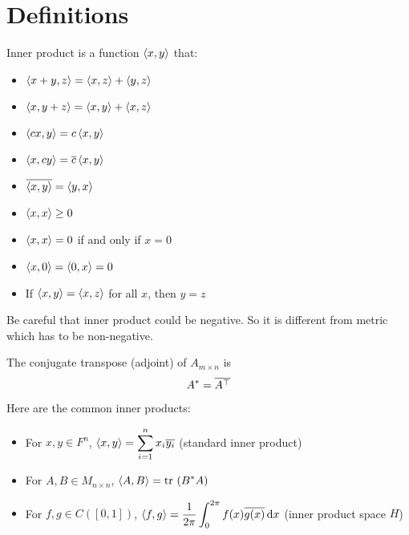 \section{Definitions}

Inner product is a function $\left\langle \displaystyle x, y \right\rangle$ that:
\begin{itemize}
    \item $\left\langle \displaystyle x + y, z \right\rangle = \left\langle \displaystyle x, z \right\rangle + \left\langle \displaystyle y, z \right\rangle$    
    \item $\left\langle \displaystyle x, y+z \right\rangle = \left\langle \displaystyle x, y \right\rangle + \left\langle \displaystyle x, z \right\rangle$
    \item $\left\langle \displaystyle cx, y \right\rangle = c \left\langle \displaystyle x, y \right\rangle$
    \item $\left\langle \displaystyle x, cy \right\rangle = \overline{c} \left\langle \displaystyle x, y \right\rangle$
    \item $\overline{\left\langle \displaystyle x, y \right\rangle} = \left\langle \displaystyle y, x \right\rangle$
    \item $\left\langle \displaystyle x, x \right\rangle \geq 0$
    \item $\left\langle \displaystyle x, x \right\rangle = 0$ if and only if $x = 0$
    \item $\left\langle \displaystyle x, 0 \right\rangle = \left\langle \displaystyle 0, x \right\rangle = 0$
    \item If $\left\langle \displaystyle x, y \right\rangle = \left\langle \displaystyle x, z \right\rangle$ for all $x$, then $y = z$
\end{itemize}

Be careful that inner product could be negative. So it is different from metric which has to be non-negative.

\begin{definition}
    The conjugate transpose (adjoint) of $A_{m \times n}$ is 
    \begin{equation}
        A^* = \overline{{A}^\top}
    \end{equation}
\end{definition}

\begin{example}
    Here are the common inner products:
\begin{itemize}
    \item For $x,y \in F^n$, $\displaystyle \left\langle \displaystyle x, y \right\rangle = \sum_{i=1}^n x_i \overline{y_i}$ (standard inner product)
    \item For $A,B \in M_{n \times n}$, $\left\langle \displaystyle A, B \right\rangle = \displaystyle \mathrm{tr}~( B^* A )$
    \item For $f,g \in C([0,1])$, $\displaystyle \innerproduct{f}{g} = \frac{1}{2 \pi} \int_{0}^{2\pi} f(x) \conjugate{g(x)} \dif x$ (inner product space $H$)
\end{itemize}
\end{example}


